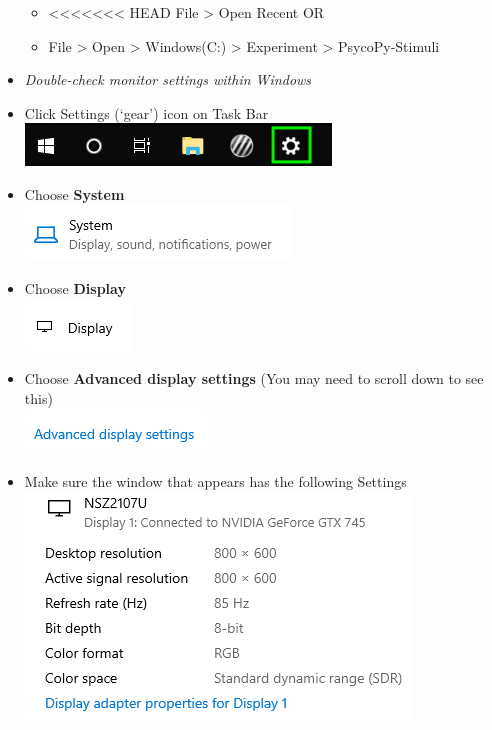 \documentclass[]{article}
\providecommand{\tightlist}{%
  \setlength{\itemsep}{0pt}\setlength{\parskip}{0pt}}
\begin{document}
\begin{itemize}
  \begin{itemize}
  \tightlist
  \item
<<<<<<< HEAD
    File \textgreater{} Open Recent OR\\
  \item
    File \textgreater{} Open \textgreater{} Windows(C:) \textgreater{}
    Experiment \textgreater{} PsycoPy-Stimuli
  \end{itemize}
\item
  \emph{Double-check monitor settings within Windows}
\item
  Click Settings (`gear') icon on Task Bar
  \includegraphics{images/DispSettings-1.PNG}\\
\item
  Choose \textbf{System}\\
  \includegraphics{images/DS2.PNG}\\
\item
  Choose \textbf{Display}\\
  \includegraphics{images/ds3.PNG}\\
\item
  Choose \textbf{Advanced display settings} (You may need to scroll down
  to see this)\\
  \includegraphics{images/DS4.PNG}\\
\item
  Make sure the window that appears has the following Settings\\
  \includegraphics{images/ds5.PNG}\\

\end{itemize}
\end{document}

